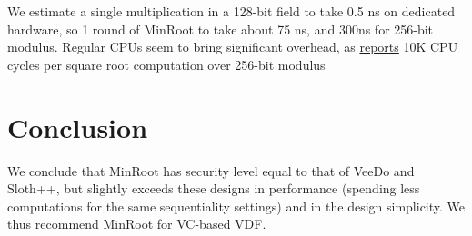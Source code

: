 \documentclass{article}
\begin{document}
We estimate a single multiplication in a 128-bit field to take 0.5 ns on dedicated hardware, so 1 round of MinRoot to take about 75 ns, and 300ns for 256-bit modulus. Regular CPUs seem to bring significant overhead, as
\href{http://stevengoldfeder.com/papers/BGB17-IEEESB-proof_of_delay_ethereum.pdf}{reports} 10K CPU cycles per square root computation over 256-bit modulus

\section{Conclusion}

We conclude that MinRoot has security level equal to that of VeeDo and Sloth++, but slightly exceeds these designs in performance (spending less computations for the same sequentiality settings) and in the design simplicity. We thus recommend MinRoot for VC-based VDF. 



\end{document}
